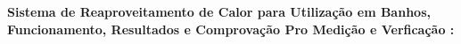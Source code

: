 
\textbf{Sistema de Reaproveitamento de Calor para Utilização em Banhos,
Funcionamento, Resultados e Comprovação Pro Medição e Verficação :}
